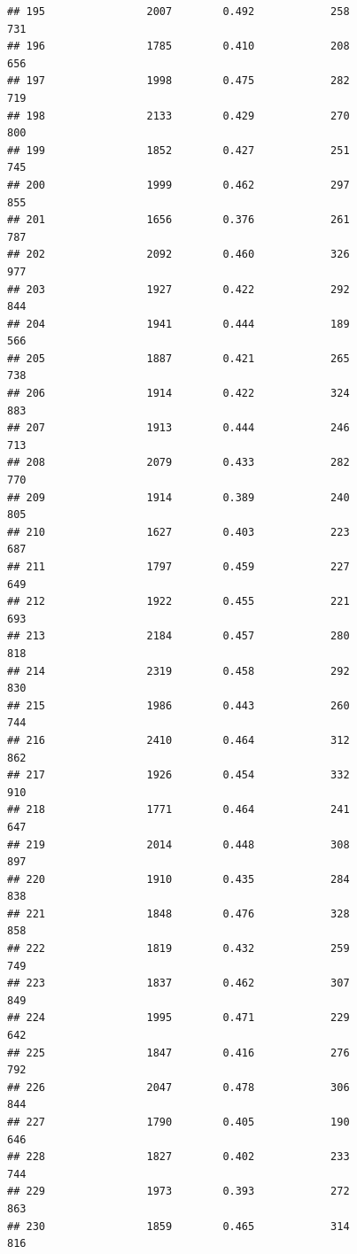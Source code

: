 \documentclass[]{book}
\begin{document}
\begin{verbatim}
## 195                2007        0.492            258                731
## 196                1785        0.410            208                656
## 197                1998        0.475            282                719
## 198                2133        0.429            270                800
## 199                1852        0.427            251                745
## 200                1999        0.462            297                855
## 201                1656        0.376            261                787
## 202                2092        0.460            326                977
## 203                1927        0.422            292                844
## 204                1941        0.444            189                566
## 205                1887        0.421            265                738
## 206                1914        0.422            324                883
## 207                1913        0.444            246                713
## 208                2079        0.433            282                770
## 209                1914        0.389            240                805
## 210                1627        0.403            223                687
## 211                1797        0.459            227                649
## 212                1922        0.455            221                693
## 213                2184        0.457            280                818
## 214                2319        0.458            292                830
## 215                1986        0.443            260                744
## 216                2410        0.464            312                862
## 217                1926        0.454            332                910
## 218                1771        0.464            241                647
## 219                2014        0.448            308                897
## 220                1910        0.435            284                838
## 221                1848        0.476            328                858
## 222                1819        0.432            259                749
## 223                1837        0.462            307                849
## 224                1995        0.471            229                642
## 225                1847        0.416            276                792
## 226                2047        0.478            306                844
## 227                1790        0.405            190                646
## 228                1827        0.402            233                744
## 229                1973        0.393            272                863
## 230                1859        0.465            314                816

\end{verbatim}
\end{document}
